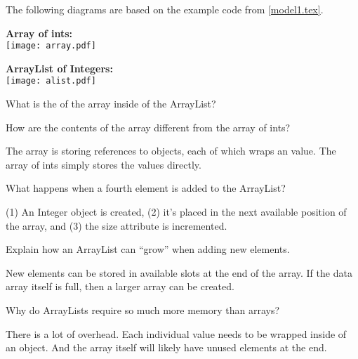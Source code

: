 
The following diagrams are based on the example code from \ref{model1.tex}.

\vspace{1em}

\textbf{Array of ints:}
\\[1ex]
\texttt{[image: array.pdf]}

\vspace{1em}

\textbf{ArrayList of Integers:}
\\[1ex]
\texttt{[image: alist.pdf]}




\Q What is the  of the array inside of the ArrayList? 


\Q How are the contents of the  array different from the array of ints?

\begin{answer}[3em]
The  array is storing references to  objects, each of which wraps an  value.
The array of ints simply stores the values directly.
\end{answer}


%


\Q What happens when a fourth element is added to the ArrayList?

\begin{answer}[3em]
(1) An Integer object is created,
(2) it's placed in the next available position of the array,
and (3) the size attribute is incremented.
\end{answer}


\Q \label{key2}
Explain how an ArrayList can ``grow'' when adding new elements.

\begin{answer}[3em]
New elements can be stored in available slots at the end of the array.
If the data array itself is full, then a larger array can be created.
\end{answer}


\Q Why do ArrayLists require so much more memory than arrays?

\begin{answer}
There is a lot of overhead.
Each individual value needs to be wrapped inside of an object.
And the array itself will likely have unused elements at the end.
\end{answer}
